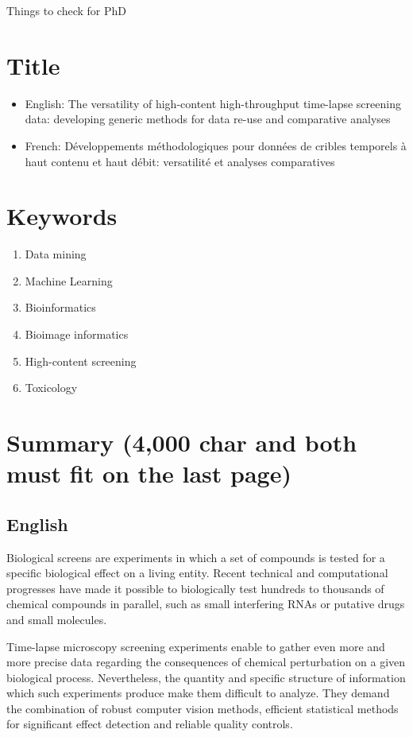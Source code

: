 \documentclass[12pt]{article}
\begin{document}
Things to check for PhD
\section{Title}
\begin{itemize}
\item English: The versatility of high-content high-throughput time-lapse screening data: developing generic methods for data re-use and comparative analyses
\item French: Développements méthodologiques pour données de cribles temporels à haut contenu et haut débit: versatilité et analyses comparatives
\end{itemize}
\section{Keywords}
\begin{enumerate}
\item Data mining
\item Machine Learning
\item Bioinformatics

\item Bioimage informatics
\item High-content screening
\item Toxicology

\end{enumerate}


\section{Summary (4,000 char and both must fit on the last page)}
\subsection{English}
Biological screens are experiments in which a set of compounds is tested for a specific biological effect on a living entity. Recent technical and computational progresses have made it possible to biologically test hundreds to thousands of chemical compounds in parallel, such as small interfering RNAs or putative drugs and small molecules.

Time-lapse microscopy screening experiments enable to gather even more and more precise data regarding the consequences of chemical perturbation on a given biological process. Nevertheless, the quantity and specific structure of information which such experiments produce make them difficult to analyze. They demand the combination of robust computer vision methods, efficient statistical methods for significant effect detection and reliable quality controls.
\end{document}
